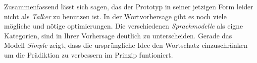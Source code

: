         Zusammenfassend lässt sich sagen, das der Prototyp in seiner jetzigen Form leider nicht als \emph{Talker} zu benutzen ist. In der Wortvorhersage gibt es noch viele mögliche und nötige optimierungen. Die verschiedenen \emph{Sprachmodelle} als eigne Kategorien, sind in Ihrer Vorhersage deutlich zu unterscheiden. Gerade das Modell \emph{Simple} zeigt, dass die ursprüngliche Idee den Wortschatz einzuschränken um die Prädiktion zu verbessern im Prinzip funtioniert.  
        
        
           \newpage